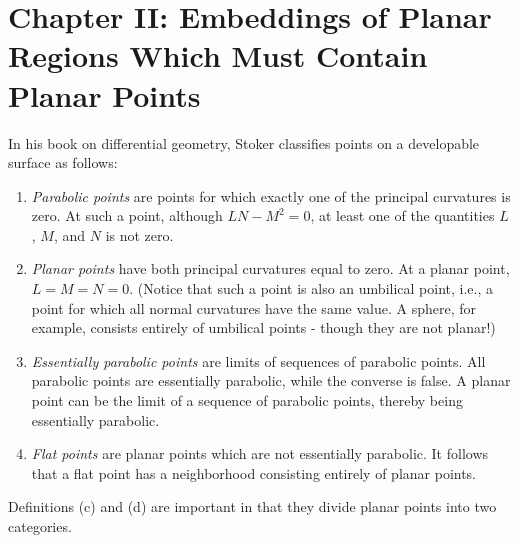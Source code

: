 \documentclass{book}
\begin{document}
\chapter*{Chapter II: Embeddings of Planar Regions Which Must Contain Planar Points}

\setcounter{equation}{0}

In his book on differential geometry, Stoker classifies points on a developable surface as follows:
\begin{enumerate}[\hspace{1cm}a)]
  \item \emph{Parabolic points} are points for which exactly one of the principal curvatures is zero. At such a point, although $LN - M^{2} = 0$, at least one of the quantities $L$, $M$, and $N$ is not zero.
  \item \emph{Planar points} have both principal curvatures equal to zero. At a planar point, $L = M = N = 0$. (Notice that such a point is also an umbilical point, i.e., a point for which all normal curvatures have the same value. A sphere, for example, consists entirely of umbilical points - though they are not planar!)
  \item \emph{Essentially parabolic points} are limits of sequences of parabolic points. All parabolic points are essentially parabolic, while the converse is false. A planar point can be the limit of a sequence of parabolic points, thereby being essentially parabolic.
  \item \emph{Flat points} are planar points which are not essentially parabolic. It follows that a flat point has a neighborhood consisting entirely of planar points.
\end{enumerate}

Definitions (c) and (d) are important in that they divide planar points into two categories.

\vspace{0.3cm}
\end{document}
